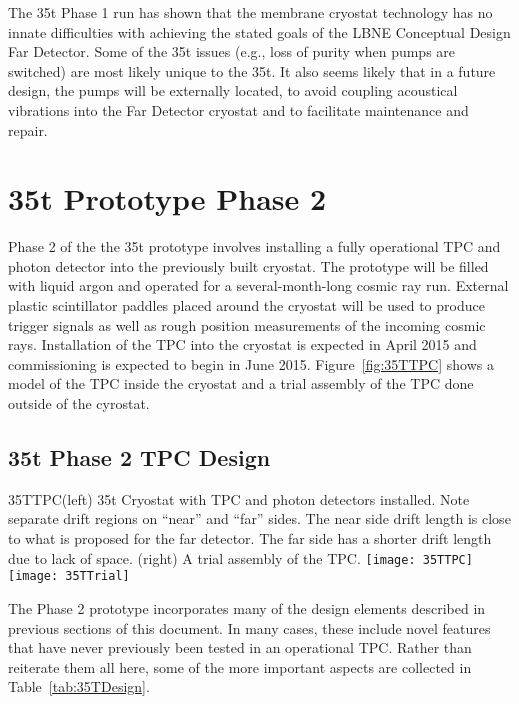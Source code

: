 The 35t Phase 1 run has shown that the membrane cryostat technology has no innate difficulties with 
achieving the stated goals of the LBNE Conceptual Design Far Detector. Some of the 35t issues (e.g., loss 
of purity when pumps are switched) are most likely unique to the 35t. It also seems likely that in a future 
design, the pumps will be externally located, to avoid coupling acoustical vibrations into the Far Detector 
cryostat and to facilitate maintenance and repair.

\section{35t Prototype Phase 2}

Phase 2 of the the 35t prototype involves installing a fully operational TPC and photon detector into 
the previously built cryostat.
The prototype will be filled with liquid argon and operated for a several-month-long cosmic ray run. 
External plastic scintillator paddles placed around the cryostat will be used to produce
trigger signals as well as rough position measurements of the incoming cosmic rays.
Installation of the TPC into the cryostat is expected in April 2015 and 
commissioning is expected to begin in June 2015.
Figure~\ref{fig:35TTPC} shows a model of the TPC inside the cryostat and a trial assembly of
the TPC done outside of the cyrostat. 

\subsection{35t Phase 2 TPC Design}

\begin{cdrfigure}{35TTPC}{(left) 35t Cryostat with TPC and photon detectors installed. 
Note separate drift regions on ``near'' and ``far'' sides.
The near side drift length is close to what is proposed for the far detector. The far
side has a shorter drift length due to lack of space.
(right) A trial assembly of the TPC.
}
\texttt{[image: 35TTPC]}  
\texttt{[image: 35TTrial]}  
\end{cdrfigure}

The Phase 2 prototype incorporates many of the design elements described in previous
sections of this document.
In many cases, these include novel features that have never previously been tested
in an operational TPC.
Rather than reiterate them all here, some of the more important
aspects are collected in Table~\ref{tab:35TDesign}.

